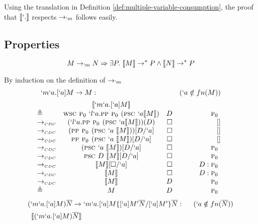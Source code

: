 Using the translation in Definition \ref{def:multiple-variable-consumption}, the proof that $\tr{`.}$ respects $\to_{`m}$ follows easily.

\subsection{Properties}

\begin{theorem}[Soundness of $\tr{`.}$]\label{theorem:soundness}
\[ M \to_{`m} N \Rightarrow \exists P.\ \llbracket M \rrbracket \to^{*} P \land \llbracket N \rrbracket \to^{*} P \]
\end{theorem}

\begin{Proof}
By induction on the definition of $\rightarrow_{`m}$
\[
\begin{array}{@{}lcrr}
  \prooflabel{`m`a.[`a]M \to M} & (`a \notin fn(M)) \\
             & \tr{`m`a.[`a]M} \\
  \triangleq & \wsc \gp `l`a.\pp \gp (\psc `a \tr{M}) & D       & \gp \\
  \tocdc\    & (`l`a.\pp \gp (\psc `a \tr{M}))(D)     & \square & []     \\
  \tocdc\    & (\pp \gp (\psc `a\ \tr{M}))[D/`a]      & \square & []     \\
  \tocdc\    & \pp \gp (\psc `a\ \tr{M})[D/`a]        & \square & []     \\
  \tocdc\    & (\psc `a\ \tr{M})[D/`a]                & \square & \gp \\
  \tocdc\    & \psc D\ \tr{M}[D/`a]                   & \square & \gp \\
  \tocdc\    & \tr{M}[\square/`a]                     & \square & D:\gp \\
  \tocdc\    & \tr{M}                                 & \square & D:\gp \\
  \tocdc\    & \tr{M}                                 & D       & \gp \\
  \triangleq & M                                      & D       & \gp \\
\end{array}
\]
\[
\begin{array}{@{}lcrr}
  \prooflabel{(`m`a.[`a]M)\mult{N} \to `m`a.[`a]M\{[`a]M'\mult{N}/[`a]M'\}\mult{N}} & (`a \notin fn(\mult{N})) \\
             & \tr{(`m`a.[`a]M)\mult{N}} \\

\end{array}\]
\end{Proof}
